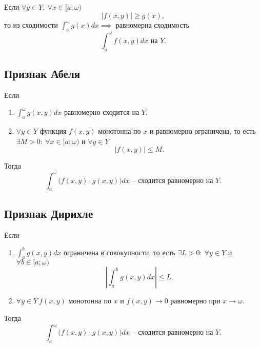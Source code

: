 \begin{corollary}
    Если $\forall y \in Y, \ \forall x \in [a;\omega)$
    \[
        \big|f(x,y)\big| \geqslant g(x),
    \]
    то из сходимости $\int_{a}^{\omega}g(x)dx \implies$ равномерна сходимость
    \[
        \int_{a}^{\omega}f(x,y)dx \text{ на }Y.
    \]
\end{corollary}

\subsection{Признак Абеля}

\begin{theorem}
    Если \begin{enumerate}
        \item $\int_{a}^{\omega}g(x,y)dx$ равномерно сходится на $Y$.
        \item $\forall y \in Y$ функция $f(x,y)$ монотонна по $x$ и равномерно ограничена, то есть $\exists M > 0: \ \forall x \in [a;\omega)$ и $\forall y \in Y$
              \[
                  \left|f(x,y)\right| \leqslant M.
              \]
    \end{enumerate}

    Тогда
    \[
        \int_{a}^{\omega}\big(f(x,y) \cdot g(x,y)\big)dx \text{ -- сходится равномерно на }Y.
    \]
\end{theorem}

\subsection{Признак Дирихле}

\begin{theorem}
    Если
    \begin{enumerate}
        \item $\int_{a}^{b}g(x,y)dx$ ограничена в совокупности, то есть $\exists L > 0: \ \forall y \in Y$ и $\forall b \in [a;\omega)$
              \[
                  \left|\int_{a}^{b}g(x,y)dx\right| \leqslant L.
              \]
        \item $\forall y \in Y \ f(x,y)$ монотонна по $x$ и $f(x,y) \rightarrow 0$ равномерно при $x \rightarrow \omega$.
    \end{enumerate}

    Тогда
    \[
        \int_{a}^{\omega}\big(f(x,y)\cdot g(x,y)\big)dx \text{ -- сходится равномерно на } Y.
    \]
\end{theorem}